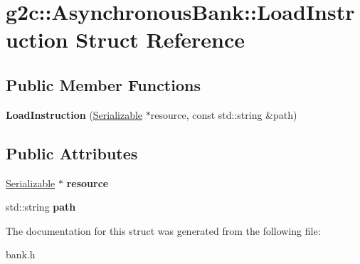 \hypertarget{structg2c_1_1_asynchronous_bank_1_1_load_instruction}{
\section{g2c::AsynchronousBank::LoadInstruction Struct Reference}
\label{structg2c_1_1_asynchronous_bank_1_1_load_instruction}
}
\subsection*{Public Member Functions}
\begin{DoxyCompactItemize}
\item 
\hypertarget{structg2c_1_1_asynchronous_bank_1_1_load_instruction_a4b07499ca3d50b10da1dae566e562bb4}{
{\bfseries LoadInstruction} (\hyperlink{classg2c_1_1_serializable}{Serializable} $\ast$resource, const std::string \&path)}
\label{structg2c_1_1_asynchronous_bank_1_1_load_instruction_a4b07499ca3d50b10da1dae566e562bb4}

\end{DoxyCompactItemize}
\subsection*{Public Attributes}
\begin{DoxyCompactItemize}
\item 
\hypertarget{structg2c_1_1_asynchronous_bank_1_1_load_instruction_abb990de229ccf5ea6d7f4cdae64230dc}{
\hyperlink{classg2c_1_1_serializable}{Serializable} $\ast$ {\bfseries resource}}
\label{structg2c_1_1_asynchronous_bank_1_1_load_instruction_abb990de229ccf5ea6d7f4cdae64230dc}

\item 
\hypertarget{structg2c_1_1_asynchronous_bank_1_1_load_instruction_a90dc92582af44fcee3f513adf8176053}{
std::string {\bfseries path}}
\label{structg2c_1_1_asynchronous_bank_1_1_load_instruction_a90dc92582af44fcee3f513adf8176053}

\end{DoxyCompactItemize}


The documentation for this struct was generated from the following file:\begin{DoxyCompactItemize}
\item 
bank.h\end{DoxyCompactItemize}
